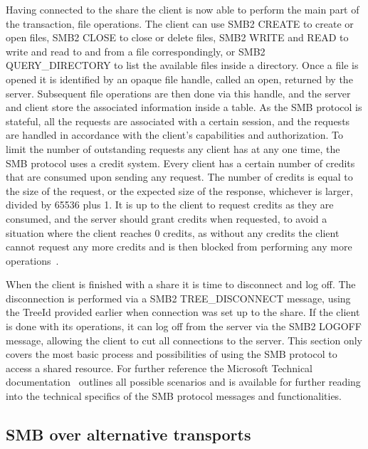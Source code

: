 \documentclass[english, 12pt, a4paper, elec, utf8, a-2b, online]{aaltothesis}
\begin{document}
Having connected to the share the client is now able to perform the main part of the
transaction, file operations. The client can use SMB2 CREATE to create
or open files, SMB2 CLOSE to close or delete files, SMB2 WRITE and READ to write and
read to and from a file correspondingly, or SMB2 QUERY\_DIRECTORY to list the available files inside
a directory.
Once a file is opened it is identified by an opaque file handle, called an open, returned by the server.
Subsequent file operations are then done via this handle, and the server and client
store the associated information inside a table.
As the SMB protocol is stateful, all the requests are associated with a certain
session, and the requests are handled in accordance with the client's capabilities
and authorization. To limit the number of outstanding requests any client has at
any one time, the SMB protocol uses a credit system. Every
client has a certain number of credits that are consumed upon sending any request.
The number of credits is equal to the size of the request, or the expected size of
the response, whichever is larger, divided by 65536 plus 1. It is up to the client
to request credits as they are consumed, and the server should grant credits when
requested, to avoid a situation where the client reaches 0 credits, as without
any credits the client cannot request any more credits and is then blocked from
performing any more operations~\cite{smb2_tech}.

When the client is finished with a share it is time to disconnect and log off. The
disconnection is performed via a SMB2 TREE\_DISCONNECT message, using the TreeId
provided earlier when connection was set up to the share. If the client is done with its
operations, it can log off from the server via the SMB2 LOGOFF message, allowing
the client to cut all connections to the server. This section only covers the most
basic process and possibilities of using the SMB protocol to access a shared resource.
For further reference the Microsoft Technical documentation~\cite{smb2_tech} outlines all possible
scenarios and is available for further reading into the technical specifics of the
SMB protocol messages and functionalities.

\subsection{SMB over alternative transports}
\end{document}
